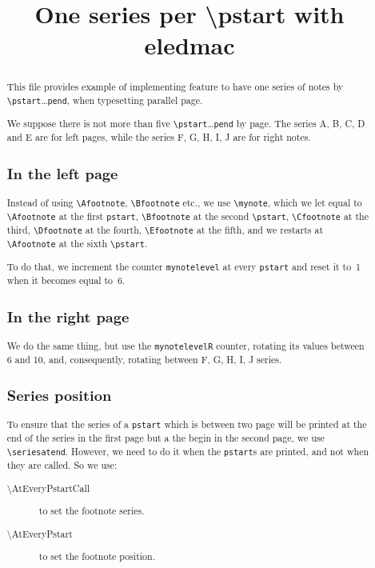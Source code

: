 \documentclass{article}
\newcounter{mynotelevel}%
\newcounter{mynotelevelR}%
\begin{document}
\title{One series per \textbackslash pstart with eledmac}
\author{}
\maketitle
\begin{abstract}
This file provides example of implementing feature to have one series of notes by \verb+\pstart+…\verb+pend+, when typesetting parallel page.

We suppose there is not more than five \verb+\pstart+…\verb+pend+ by page. The series A, B, C, D and E are for left pages, while the series F, G, H, I, J are for right notes.

\subsection*{In the left page}
Instead of using \verb+\Afootnote+, \verb+\Bfootnote+ etc., we use \verb+\mynote+, which we let equal to \verb+\Afootnote+ at the first \verb+pstart+, \verb+\Bfootnote+ at the second \verb+\pstart+, \verb+\Cfootnote+ at the third, \verb+\Dfootnote+ at the fourth, \verb+\Efootnote+ at the fifth, and we restarts at \verb+\Afootnote+ at the sixth \verb+\pstart+.

To do that, we increment the counter \verb+mynotelevel+ at every \verb+pstart+ and reset it to~1 when it becomes equal to~6.



\subsection*{In the right page}

We do the same thing, but use the \verb+mynotelevelR+ counter, rotating its values between 6 and 10, and, consequently, rotating between F, G, H, I, J series.

\subsection*{Series position}
To ensure that the series of a \verb+pstart+ which is between two page will be printed at the end of the series in the first page but a the begin in the second page, we use \verb+\seriesatend+. However, we need to do it when the \verb+pstart+s are printed, and not when they are called. So we use:
\begin{description}
  \item[\textbackslash AtEveryPstartCall] to set the footnote series.
  \item[\textbackslash AtEveryPstart] to set the footnote position.
\end{description}
\end{abstract}
\end{document}
